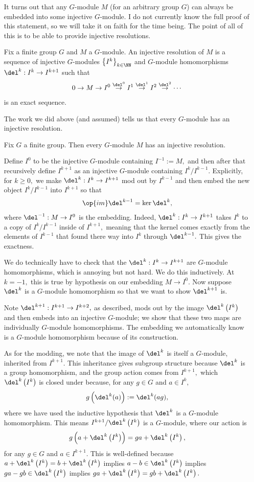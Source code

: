 It turns out that any $G$-module $M$ (for an arbitrary group $G$) can always be embedded into some injective $G$-module. I do not currently know the full proof of this statement, so we will take it on faith for the time being. The point of all of this is to be able to provide injective resolutions.
\begin{definition}
    Fix a finite group $G$ and $M$ a $G$-module. An injective resolution of $M$ is a sequence of injective $G$-modules $\left\{I^k\right\}_{k\in\NN}$ and $G$-module homomorphisms $\del^k:I^k\to I^{k+1}$ such that
    \[0\to M\to I^0\stackrel{\del^0}\to I^1\stackrel{\del^1}\to I^2\stackrel{\del^2}\to\cdots\]
    is an exact sequence.
\end{definition}
The work we did above (and assumed) tells us that every $G$-module has an injective resolution.
\begin{lemma}
    Fix $G$ a finite group. Then every $G$-module $M$ has an injective resolution.
\end{lemma}
Define $I^0$ to be the injective $G$-module containing $I^{-1}:=M,$ and then after that recursively define $I^{k+1}$ as an injective $G$-module containing $I^k/I^{k-1}.$ Explicitly, for $k\ge0,$ we make $\del^k:I^k\to I^{k+1}$ mod out by $I^{k-1}$ and then embed the new object $I^k/I^{k-1}$ into $I^{k+1}$ so that
\[\op{im}\del^{k-1}=\ker\del^k,\]
where $\del^{-1}:M\to I^0$ is the embedding. Indeed, $\del^k:I^k\to I^{k+1}$ takes $I^k$ to a copy of $I^k/I^{k-1}$ inside of $I^{k+1},$ meaning that the kernel comes exactly from the elements of $I^{k-1}$ that found there way into $I^k$ through $\del^{k-1}.$ This gives the exactness.

We do technically have to check that the $\del^k:I^k\to I^{k+1}$ are $G$-module homomorphisms, which is annoying but not hard. We do this inductively. At $k=-1,$ this is true by hypothesis on our embedding $M\to I^0.$ Now suppose $\del^k$ is a $G$-module homomorphism so that we want to show $\del^{k+1}$ is.

Note $\del^{k+1}:I^{k+1}\to I^{k+2},$ as described, mods out by the image $\del^k\left(I^k\right)$ and then embeds into an injective $G$-module; we show that these two maps are individually $G$-module homomorphisms. The embedding we automatically know is a $G$-module homomorphism because of its construction.

As for the modding, we note that the image of $\del^k$ is itself a $G$-module, inherited from $I^{k+1}.$ This inheritance gives subgroup structure because $\del^k$ is a group homomorphism, and the group action comes from $I^{k+1},$ which $\del^k\left(I^k\right)$ is closed under because, for any $g\in G$ and $a\in I^k,$
\[g\left(\del^k(a)\right):=\del^k(ag),\]
where we have used the inductive hypothesis that $\del^k$ is a $G$-module homomorphism. This means $I^{k+1}/\del^k\left(I^k\right)$ is a $G$-module, where our action is
\[g\left(a+\del^k\left(I^k\right)\right)=ga+\del^k\left(I^k\right),\]
for any $g\in G$ and $a\in I^{k+1}.$ This is well-defined because $a+\del^k\left(I^k\right)=b+\del^k\left(I^k\right)$ implies $a-b\in\del^k\left(I^k\right)$ implies $ga-gb\in\del^k\left(I^k\right)$ implies $ga+\del^k\left(I^k\right)=gb+\del^k\left(I^k\right).$

